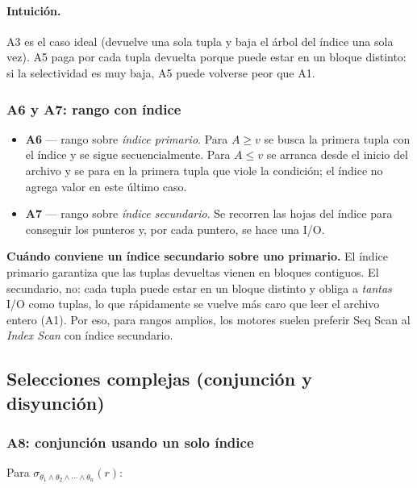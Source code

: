 \documentclass[11pt,a4paper]{article}
\newcommand{\sel}[1]{\sigma_{#1}}
\begin{document}
\paragraph{Intuición.} A3 es el caso ideal (devuelve una sola tupla y baja
el árbol del índice una sola vez). A5 paga por cada tupla devuelta porque
puede estar en un bloque distinto: si la selectividad es muy baja, A5 puede
volverse peor que A1.

\subsubsection*{A6 y A7: rango con índice}

\begin{itemize}
    \item \textbf{A6} --- rango sobre \emph{índice primario}. Para $A\ge v$
    se busca la primera tupla con el índice y se sigue secuencialmente.
    Para $A\le v$ se arranca desde el inicio del archivo y se para en la
    primera tupla que viole la condición; el índice no agrega valor en este
    último caso.
    \item \textbf{A7} --- rango sobre \emph{índice secundario}. Se recorren
    las hojas del índice para conseguir los punteros y, por cada puntero,
    se hace una I/O.
\end{itemize}

\begin{nota}
\textbf{Cuándo conviene un índice secundario sobre uno primario.} El índice
primario garantiza que las tuplas devueltas vienen en bloques contiguos. El
secundario, no: cada tupla puede estar en un bloque distinto y obliga a
\emph{tantas} I/O como tuplas, lo que rápidamente se vuelve más caro que
leer el archivo entero (A1). Por eso, para rangos amplios, los motores
suelen preferir Seq Scan al \emph{Index Scan} con índice secundario.
\end{nota}

\subsection{Selecciones complejas (conjunción y disyunción)}

\subsubsection*{A8: conjunción usando un solo índice}

Para $\sel{\theta_1 \wedge \theta_2 \wedge \cdots \wedge \theta_n}(r)$:
\end{document}
